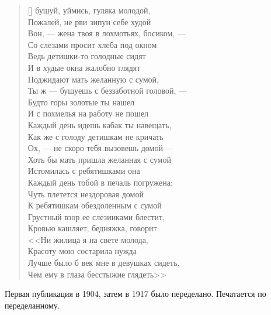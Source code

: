\settowidth{\versewidth}{Лучше было б век мне в девушках сидеть,}
\begin{verse}[\versewidth]
 бушуй, уймись, гуляка молодой,\\
Пожалей, не рви зипун себе худой\ldotst\\
Вон, --- жена твоя в лохмотьях, босиком, ---\\
Со слезами просит хлеба под окном\ldotse\\
Ведь детишки-то голодные сидят\\
И в худые окна жалобно глядят\ldotst\\
Поджидают мать желанную с сумой,\\
Ты ж --- бушуешь с беззаботной головой, ---\\
Будто горы золотые ты нашел\ldotst\\
И с похмелья на работу не пошел\ldotst\\
Каждый день идешь кабак ты навещать,\\
Как же с голоду детишкам не кричать\ldotsq\\
Ох, --- не скоро тебя вызовешь домой ---\\
Хоть бы мать пришла желанная с сумой\ldotst\\
Истомилась с ребятишками она\\
Каждый день тобой в печаль погружена;\\
Чуть плетется нездоровая домой\\
К ребятишкам обездоленным с сумой\ldotst\\
Грустный взор ее слезинками блестит,\\
Кровью кашляет, бедняжка, говорит:\\
<<Ни жилица я на свете молода,\\
Красоту мою состарила нужда\ldotst\\
Лучше было б век мне в девушках сидеть,\\
Чем ему в глаза бесстыжие глядеть>>\ldotst
\end{verse}
Первая публикация в 1904, затем в 1917 было переделано. Печатается по переделанному.

